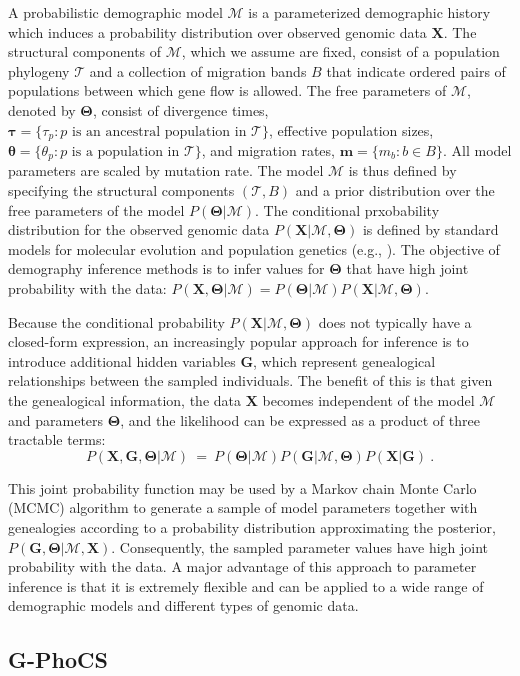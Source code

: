 \documentclass[11pt]{article}
\newcommand{\vect}[1]{\boldsymbol{\mathbf{#1}}}
\newcommand{\X}{\vect{X}}
\newcommand{\M}{\mathcal{M}}
\newcommand{\Tr}{\mathcal{T}}
\newcommand{\G}{\vect{G}}
\newcommand{\T}{\vect{\Theta}}
\newcommand{\1}{\mathbbm{1}}
\newcommand{\gp}{G-PhoCS }
\newcommand{\taus}{\vect\tau}
\newcommand{\thetas}{\vect\theta}
\newcommand{\migs}{\vect{m}}
\begin{document}
A probabilistic demographic model $\M$ is a parameterized demographic history which induces a probability distribution over observed genomic data $\X$.
%
The structural components of $\M$, which we assume are fixed, consist of a population phylogeny $\Tr$ and a collection
of migration bands $B$ that indicate ordered pairs of populations between which gene flow is allowed.
%
The free parameters of $\M$, denoted by $\T$, consist of divergence times, $\taus=\{\tau_p:p \text{ is an ancestral population in } \Tr\}$,
effective population sizes, $\thetas=\{\theta_p: p \text{ is a population in } \Tr\}$, and migration rates, $\migs=\{m_b:b \in B\}$.
%
All model parameters are scaled by mutation rate.
%
The model $\M$ is thus defined by specifying the structural components $(\Tr,B)$ and a prior distribution over the free parameters of the model $P(\T|\M)$.
%
The conditional prxobability distribution for the observed genomic data $P(\X|\M,\T)$ is defined by standard models for molecular evolution and population genetics (e.g., \cite{JUKECANT69,KING82A}).
%
The objective of demography inference methods is to infer values for $\T$ that have high joint probability with the data:
$P(\X,\T|\M)=P(\T|\M)P(\X|\M,\T)$.

%
Because the conditional probability $P(\X|\M,\T)$ does not typically have a closed-form expression, an increasingly popular approach for
inference is to introduce additional hidden variables $\G$, which represent genealogical relationships
between the sampled individuals.
%
The benefit of this is that given the genealogical information, the data $\X$ becomes independent of the model $\M$ and parameters $\T$,
and the likelihood can be expressed as a product of three tractable terms:
%
%
\begin{equation}\label{eq:likelihood}
 P(\X,\G,\T|\M) ~=~ P(\T|\M) P(\G|\M,\T) P(\X|\G)~.
\end{equation}
%
%

This joint probability function may be used by a Markov chain Monte Carlo (MCMC) algorithm to generate a sample of model parameters
together with genealogies according to a probability distribution approximating the posterior, $P(\G,\T|\M,\X)$.
%
Consequently, the sampled parameter values have high joint probability with the data.
%
A major advantage of this approach to parameter inference is that it is extremely flexible and can be applied to a wide range of demographic models and different types of genomic data.
%


\subsection{\gp}
\end{document}
